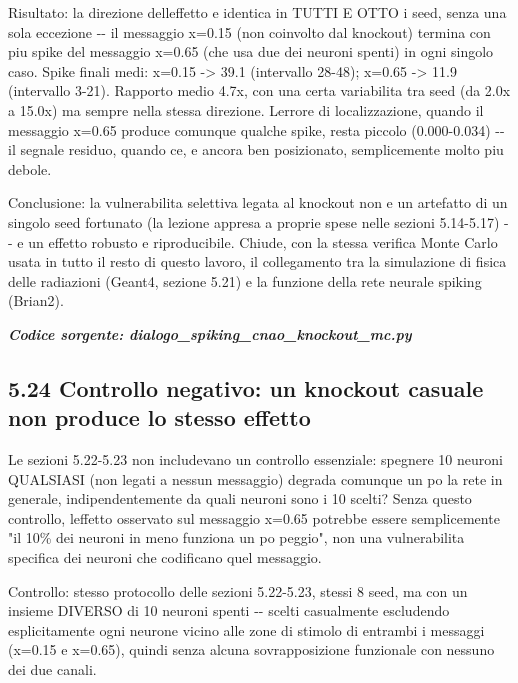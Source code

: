 \documentclass[
  italian,
]{article}
\begin{document}
Risultato: la direzione dell\textquotesingle effetto e\textquotesingle{} identica in TUTTI E OTTO i seed, senza una sola eccezione -\/- il messaggio x=0.15 (non coinvolto dal knockout) termina con piu\textquotesingle{} spike del messaggio x=0.65 (che usa due dei neuroni spenti) in ogni singolo caso. Spike finali medi: x=0.15 -\textgreater{} 39.1 (intervallo 28-48); x=0.65 -\textgreater{} 11.9 (intervallo 3-21). Rapporto medio 4.7x, con una certa variabilita\textquotesingle{} tra seed (da 2.0x a 15.0x) ma sempre nella stessa direzione. L\textquotesingle errore di localizzazione, quando il messaggio x=0.65 produce comunque qualche spike, resta piccolo (0.000-0.034) -\/- il segnale residuo, quando c\textquotesingle e\textquotesingle, e\textquotesingle{} ancora ben posizionato, semplicemente molto piu\textquotesingle{} debole.

Conclusione: la vulnerabilita\textquotesingle{} selettiva legata al knockout non e\textquotesingle{} un artefatto di un singolo seed fortunato (la lezione appresa a proprie spese nelle sezioni 5.14-5.17) -\/- e\textquotesingle{} un effetto robusto e riproducibile. Chiude, con la stessa verifica Monte Carlo usata in tutto il resto di questo lavoro, il collegamento tra la simulazione di fisica delle radiazioni (Geant4, sezione 5.21) e la funzione della rete neurale spiking (Brian2).

\textit{\textbf{Codice sorgente: dialogo\_\allowbreak{}spiking\_\allowbreak{}cnao\_\allowbreak{}knockout\_\allowbreak{}mc.py}}


\subsection{5.24 Controllo negativo: un knockout casuale non produce lo stesso effetto}\label{controllo-negativo-un-knockout-casuale-non-produce-lo-stesso-effetto}

Le sezioni 5.22-5.23 non includevano un controllo essenziale: spegnere 10 neuroni QUALSIASI (non legati a nessun messaggio) degrada comunque un po\textquotesingle{} la rete in generale, indipendentemente da quali neuroni sono i 10 scelti? Senza questo controllo, l\textquotesingle effetto osservato sul messaggio x=0.65 potrebbe essere semplicemente "il 10\% dei neuroni in meno funziona un po\textquotesingle{} peggio", non una vulnerabilita\textquotesingle{} specifica dei neuroni che codificano quel messaggio.

Controllo: stesso protocollo delle sezioni 5.22-5.23, stessi 8 seed, ma con un insieme DIVERSO di 10 neuroni spenti -\/- scelti casualmente escludendo esplicitamente ogni neurone vicino alle zone di stimolo di entrambi i messaggi (x=0.15 e x=0.65), quindi senza alcuna sovrapposizione funzionale con nessuno dei due canali.
\end{document}
